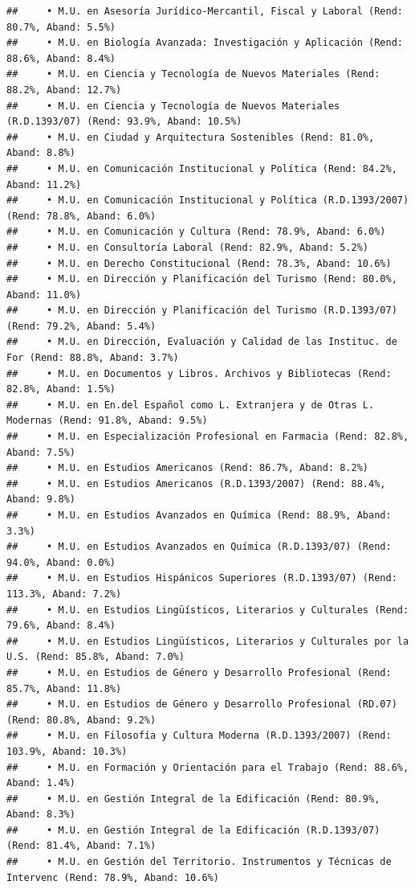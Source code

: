 \documentclass[
]{article}
\begin{document}
\begin{verbatim}
##     • M.U. en Asesoría Jurídico-Mercantil, Fiscal y Laboral (Rend: 80.7%, Aband: 5.5%)
##     • M.U. en Biología Avanzada: Investigación y Aplicación (Rend: 88.6%, Aband: 8.4%)
##     • M.U. en Ciencia y Tecnología de Nuevos Materiales (Rend: 88.2%, Aband: 12.7%)
##     • M.U. en Ciencia y Tecnología de Nuevos Materiales (R.D.1393/07) (Rend: 93.9%, Aband: 10.5%)
##     • M.U. en Ciudad y Arquitectura Sostenibles (Rend: 81.0%, Aband: 8.8%)
##     • M.U. en Comunicación Institucional y Política (Rend: 84.2%, Aband: 11.2%)
##     • M.U. en Comunicación Institucional y Política (R.D.1393/2007) (Rend: 78.8%, Aband: 6.0%)
##     • M.U. en Comunicación y Cultura (Rend: 78.9%, Aband: 6.0%)
##     • M.U. en Consultoría Laboral (Rend: 82.9%, Aband: 5.2%)
##     • M.U. en Derecho Constitucional (Rend: 78.3%, Aband: 10.6%)
##     • M.U. en Dirección y Planificación del Turismo (Rend: 80.0%, Aband: 11.0%)
##     • M.U. en Dirección y Planificación del Turismo (R.D.1393/07) (Rend: 79.2%, Aband: 5.4%)
##     • M.U. en Dirección, Evaluación y Calidad de las Instituc. de For (Rend: 88.8%, Aband: 3.7%)
##     • M.U. en Documentos y Libros. Archivos y Bibliotecas (Rend: 82.8%, Aband: 1.5%)
##     • M.U. en En.del Español como L. Extranjera y de Otras L. Modernas (Rend: 91.8%, Aband: 9.5%)
##     • M.U. en Especialización Profesional en Farmacia (Rend: 82.8%, Aband: 7.5%)
##     • M.U. en Estudios Americanos (Rend: 86.7%, Aband: 8.2%)
##     • M.U. en Estudios Americanos (R.D.1393/2007) (Rend: 88.4%, Aband: 9.8%)
##     • M.U. en Estudios Avanzados en Química (Rend: 88.9%, Aband: 3.3%)
##     • M.U. en Estudios Avanzados en Química (R.D.1393/07) (Rend: 94.0%, Aband: 0.0%)
##     • M.U. en Estudios Hispánicos Superiores (R.D.1393/07) (Rend: 113.3%, Aband: 7.2%)
##     • M.U. en Estudios Lingüísticos, Literarios y Culturales (Rend: 79.6%, Aband: 8.4%)
##     • M.U. en Estudios Lingüísticos, Literarios y Culturales por la U.S. (Rend: 85.8%, Aband: 7.0%)
##     • M.U. en Estudios de Género y Desarrollo Profesional (Rend: 85.7%, Aband: 11.8%)
##     • M.U. en Estudios de Género y Desarrollo Profesional (RD.07) (Rend: 80.8%, Aband: 9.2%)
##     • M.U. en Filosofía y Cultura Moderna (R.D.1393/2007) (Rend: 103.9%, Aband: 10.3%)
##     • M.U. en Formación y Orientación para el Trabajo (Rend: 88.6%, Aband: 1.4%)
##     • M.U. en Gestión Integral de la Edificación (Rend: 80.9%, Aband: 8.3%)
##     • M.U. en Gestión Integral de la Edificación (R.D.1393/07) (Rend: 81.4%, Aband: 7.1%)
##     • M.U. en Gestión del Territorio. Instrumentos y Técnicas de Intervenc (Rend: 78.9%, Aband: 10.6%)

\end{verbatim}
\end{document}
